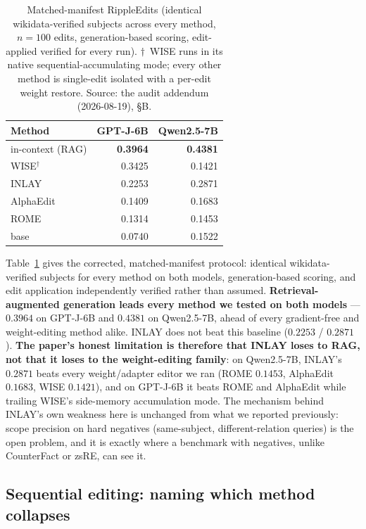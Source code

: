 \documentclass[11pt]{article}
\begin{document}
\begin{table}[t]
  \centering
  \small
  \begin{tabular}{@{}lrr@{}}
    \toprule
    Method & GPT-J-6B & Qwen2.5-7B \\
    \midrule
    in-context (RAG) & \textbf{0.3964} & \textbf{0.4381} \\
    WISE$^\dagger$   & 0.3425 & 0.1421 \\
    INLAY            & 0.2253 & 0.2871 \\
    AlphaEdit        & 0.1409 & 0.1683 \\
    ROME             & 0.1314 & 0.1453 \\
    base             & 0.0740 & 0.1522 \\
    \bottomrule
  \end{tabular}
  \caption{Matched-manifest RippleEdits (identical wikidata-verified
  subjects across every method, $n{=}100$ edits, generation-based scoring,
  edit-applied verified for every run). $\dagger$~WISE runs in its native
  sequential-accumulating mode; every other method is single-edit isolated
  with a per-edit weight restore. Source:
  the audit addendum (2026-08-19), \S B.}
  \label{tab:ripple}
\end{table}

Table~\ref{tab:ripple} gives the corrected, matched-manifest protocol:
identical wikidata-verified subjects for every method on both models,
generation-based scoring, and edit application independently verified rather
than assumed. \textbf{Retrieval-augmented generation leads every method we
tested on both models} --- $0.3964$ on GPT-J-6B and $0.4381$ on Qwen2.5-7B,
ahead of every gradient-free and weight-editing method alike. INLAY does not
beat this baseline ($0.2253$ / $0.2871$). \textbf{The paper's honest
limitation is therefore that INLAY loses to RAG, not that it loses to the
weight-editing family}: on Qwen2.5-7B, INLAY's $0.2871$ beats every
weight/adapter editor we ran (ROME $0.1453$, AlphaEdit $0.1683$, WISE
$0.1421$), and on GPT-J-6B it beats ROME and AlphaEdit while trailing WISE's
side-memory accumulation mode. The mechanism behind INLAY's own weakness here
is unchanged from what we reported previously: scope precision on hard
negatives (same-subject, different-relation queries) is the open problem,
and it is exactly where a benchmark with negatives, unlike CounterFact or
zsRE, can see it.

\subsection{Sequential editing: naming which method collapses}
\label{sec:sequential}
\end{document}
